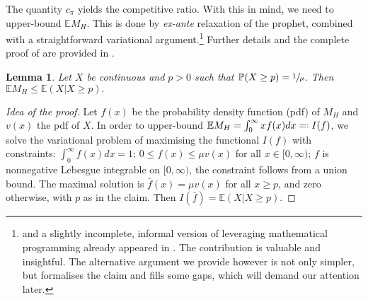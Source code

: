 \documentclass[11pt, a4paper, twoside]{article}
\newcommand*{\eqdef}{=\mathrel{\vcenter{\baselineskip0.5ex\lineskiplimit0pt
			\hbox{\scriptsize.}\hbox{\scriptsize.} }}}
\newcommand{\EE}{\mathbb{E}}
\newcommand{\PP}{\mathbb{P}}
\newtheorem{lemma}{Lemma}[section]
\numberwithin{equation}{section}
\begin{document}
	The quantity $c_\pi$ yields the competitive ratio. With this in mind, we need to upper-bound $\EE M_H$. This is done by \textit{ex-ante} relaxation of the prophet, combined with a straightforward variational argument.\footnote{ and a slightly incomplete, informal version of  leveraging mathematical programming already appeared in \cite[Theorem~3.2]{AliBanGolMunWan20}. The contribution is valuable and insightful. The alternative argument we provide however is not only simpler, but formalises the claim and fills some gaps, which will demand our attention later.} Further details and the complete proof of  are provided in .
	\begin{lemma}\label{max}
		Let $X$ be continuous and $p>0$ such that $\PP(X\geq p)=\sfrac{1}{\mu}$. Then $\EE M_H\le\EE(X|X\ge p).$
	\end{lemma}
        \begin{proof}[Idea of the proof]
		Let $f(x)$ be the probability density function (pdf) of $M_H$ and $v(x)$ the pdf of $X$. In order to upper-bound $\EE M_H=\int_0^\infty x f(x)dx\eqdef I(f)$, we solve the variational problem of maximising the functional $I(f)$ with constraints:
		$\int_0^\infty f(x)dx=1$; $0\le f(x)\le\mu v(x)$ for all $x\in[0,\infty)$; $f$ is nonnegative Lebesgue integrable on $[0,\infty)$, the constraint follows from a union bound. The maximal solution is $\bar{f}(x)=\mu v(x)$ for all $x\ge p$, and zero otherwise, with $p$ as in the claim. Then $I(\bar{f})=\EE(X|X\ge p)$.
	\end{proof}
	
\end{document}
